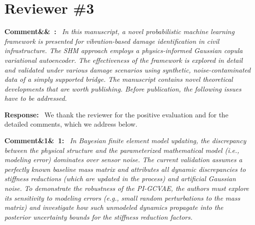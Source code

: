 \documentclass[11pt]{article}
\newenvironment{rcomment}[1]{\par\bigskip\noindent\textbf{Comment\ifx&#1&\else\ #1\fi:}\ \itshape}{\par}
\newenvironment{response}{\par\smallskip\noindent\color{resp}\textbf{Response:}\ }{\par}
\begin{document}
\section{Reviewer \#3}

\begin{rcomment}{}
In this manuscript, a novel probabilistic machine learning framework is presented for vibration-based damage
identification in civil infrastructure. The SHM approach employs a physics-informed Gaussian copula variational
autoencoder. The effectiveness of the framework is explored in detail and validated under various damage scenarios
using synthetic, noise-contaminated data of a simply supported bridge. The manuscript contains novel theoretical
developments that are worth publishing. Before publication, the following issues have to be addressed.
\end{rcomment}

\begin{response}
We thank the reviewer for the positive evaluation and for the detailed comments, which we address below.
\end{response}

\begin{rcomment}{1}
In Bayesian finite element model updating, the discrepancy between the physical structure and the parameterized
mathematical model (i.e., modeling error) dominates over sensor noise. The current validation assumes a perfectly known
baseline mass matrix and attributes all dynamic discrepancies to stiffness reductions (which are updated in the process)
and artificial Gaussian noise. To demonstrate the robustness of the PI-GCVAE, the authors must explore its sensitivity
to modeling errors (e.g., small random perturbations to the mass matrix) and investigate how such unmodeled dynamics
propagate into the posterior uncertainty bounds for the stiffness reduction factors.
\end{rcomment}
\end{document}
